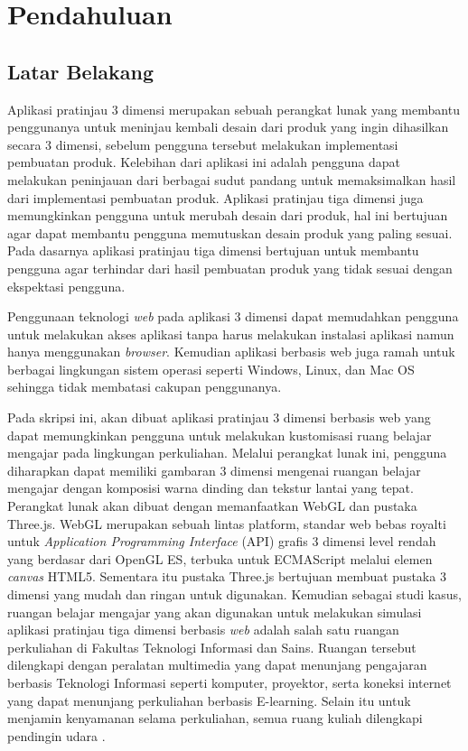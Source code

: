 \chapter{Pendahuluan}
\label{chap:intro}
   
\section{Latar Belakang}
\label{sec:label}

Aplikasi pratinjau 3 dimensi merupakan sebuah perangkat lunak yang membantu penggunanya untuk meninjau kembali desain dari produk yang ingin dihasilkan secara 3 dimensi, sebelum pengguna tersebut melakukan implementasi pembuatan produk. Kelebihan dari aplikasi ini adalah pengguna dapat melakukan peninjauan dari berbagai sudut pandang untuk memaksimalkan hasil dari implementasi pembuatan produk. Aplikasi pratinjau tiga dimensi juga memungkinkan pengguna untuk merubah desain dari produk, hal ini bertujuan agar dapat membantu pengguna memutuskan desain produk yang paling sesuai. Pada dasarnya aplikasi pratinjau tiga dimensi bertujuan untuk membantu pengguna agar terhindar dari hasil pembuatan produk yang tidak sesuai dengan ekspektasi pengguna.

Penggunaan teknologi {\it web} pada aplikasi 3 dimensi dapat memudahkan pengguna untuk melakukan akses aplikasi tanpa harus melakukan instalasi aplikasi namun hanya menggunakan {\it  browser}. Kemudian aplikasi berbasis web juga ramah untuk berbagai lingkungan sistem operasi seperti Windows, Linux, dan Mac OS sehingga tidak membatasi cakupan penggunanya.

Pada skripsi ini, akan dibuat aplikasi pratinjau 3 dimensi berbasis web yang dapat memungkinkan pengguna untuk melakukan kustomisasi ruang belajar mengajar pada lingkungan perkuliahan. Melalui perangkat lunak ini, pengguna diharapkan dapat memiliki gambaran 3 dimensi mengenai ruangan belajar mengajar dengan komposisi warna dinding dan tekstur lantai yang tepat. Perangkat lunak akan dibuat dengan memanfaatkan WebGL dan pustaka Three.js. WebGL merupakan sebuah lintas platform, standar web bebas royalti untuk {\it Application Programming Interface} (API) grafis 3 dimensi level rendah yang berdasar dari OpenGL ES, terbuka untuk ECMAScript melalui elemen {\it canvas} HTML5. Sementara itu pustaka Three.js bertujuan membuat pustaka 3 dimensi yang mudah dan ringan untuk digunakan. Kemudian sebagai studi kasus, ruangan belajar mengajar yang akan digunakan untuk melakukan simulasi aplikasi pratinjau tiga dimensi berbasis {\it web} adalah salah satu ruangan perkuliahan di Fakultas Teknologi Informasi dan Sains. Ruangan tersebut dilengkapi dengan peralatan multimedia yang dapat menunjang pengajaran berbasis Teknologi Informasi seperti komputer, proyektor, serta koneksi internet yang dapat menunjang perkuliahan berbasis E-learning. Selain itu untuk menjamin kenyamanan selama perkuliahan, semua ruang kuliah dilengkapi pendingin udara \cite{ftisunpar}.

